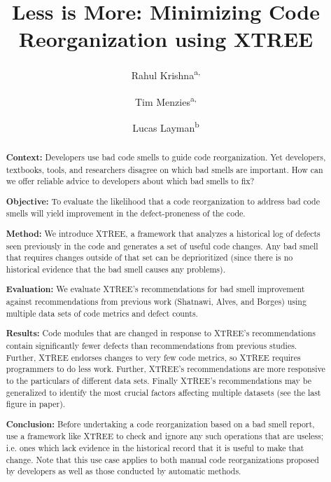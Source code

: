 \documentclass[twocolumn,5p]{elsarticle}
\theoremstyle{break}
\begin{document}
	
	\begin{frontmatter}
		
		\title{Less is More: Minimizing  Code Reorganization using XTREE}
		
		\author{Rahul Krishna\textsuperscript{a,}}
		\author{Tim Menzies\textsuperscript{a,}}
		\author{Lucas Layman\textsuperscript{b}}
		\address{\textsuperscript{a}Department of Computer Science, North 
		Carolina State University, Raleigh, NC, USA\\
			\textsuperscript{b}Fraunhofer CESE, College Park, USA}
		
		\begin{abstract}
			{\bf Context: }
			Developers use bad code smells to guide code reorganization.
			Yet developers, textbooks, tools, and researchers disagree on 
			which bad smells are important. How can we offer reliable
                        advice to developers about which bad smells to fix?
			
			\noindent
			{\bf Objective:} To evaluate the likelihood that a code 
			reorganization to address bad code smells will yield improvement in 
			the defect-proneness of the code.
			
			\noindent
			{\bf Method: } We introduce XTREE, a framework that analyzes a 
			historical log of defects seen previously in the code and generates 
			a set of useful code changes.
			Any bad smell that requires changes outside of that set can be 
			deprioritized (since there is no historical evidence that the bad 
			smell causes any problems).
			
			\noindent
			{\bf Evaluation: } We evaluate XTREE's recommendations for bad 
			smell improvement against recommendations from previous work 
			(Shatnawi, Alves, and Borges) using multiple data sets of code 
			metrics and defect counts.
			
			\noindent
			{\bf Results: }Code modules that are changed in response to XTREE's 
			recommendations contain significantly fewer defects than 
			recommendations from previous studies. Further, XTREE endorses 
			changes to very few code metrics, so XTREE requires programmers to 
			do less work. Further, XTREE's recommendations are more 
            responsive to the particulars of different data sets. Finally 
            XTREE's recommendations may be generalized to identify the most 
            crucial factors affecting multiple datasets (see the last figure in 
            paper).
                        		
			\noindent
			{\bf Conclusion: }
			Before undertaking a code reorganization based on a bad smell 
			report, use a framework like XTREE to check and ignore any such 
			operations that  are useless; i.e. ones which lack evidence in the 
			historical record  that it is useful to make that change. Note 
			that this use case applies to both manual code reorganizations 
			proposed by developers as well as those conducted by automatic 
			methods. 
			
			
		\end{abstract}
	\end{frontmatter}
\end{document}
